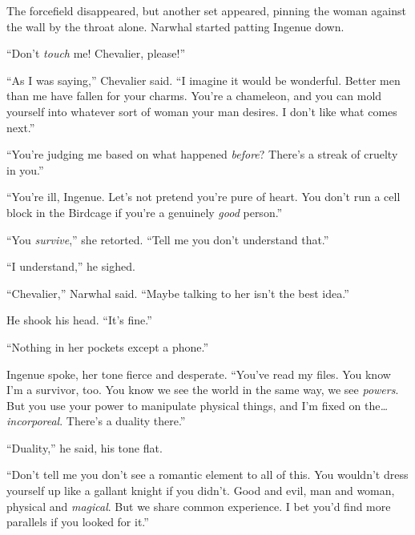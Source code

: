 The forcefield disappeared, but another set appeared, pinning the woman against the wall by the throat alone.  Narwhal started patting Ingenue down.



``Don't \emph{touch} me!  Chevalier, please!''



``As I was saying,'' Chevalier said.  ``I imagine it would be wonderful.  Better men than me have fallen for your charms.  You're a chameleon, and you can mold yourself into whatever sort of woman your man desires.  I don't like what comes next.''



``You're judging me based on what happened \emph{before}?  There's a streak of cruelty in you.''



``You're ill, Ingenue.  Let's not pretend you're pure of heart.  You don't run a cell block in the Birdcage if you're a genuinely \emph{good} person.''



``You \emph{survive},'' she retorted.  ``Tell me you don't understand that.''



``I understand,'' he sighed.



``Chevalier,'' Narwhal said.  ``Maybe talking to her isn't the best idea.''



He shook his head.  ``It's fine.''



``Nothing in her pockets except a phone.''



Ingenue spoke, her tone fierce and desperate.  ``You've read my files.  You know I'm a survivor, too.  You know we see the world in the same way, we see \emph{powers}.  But you use your power to manipulate physical things, and I'm fixed on the\emph{\ldots incorporeal}.  There's a duality there.''



``Duality,'' he said, his tone flat.



``Don't tell me you don't see a romantic element to all of this.  You wouldn't dress yourself up like a gallant knight if you didn't.  Good and evil, man and woman, physical and \emph{magical}.  But we share common experience.  I bet you'd find more parallels if you looked for it.''




